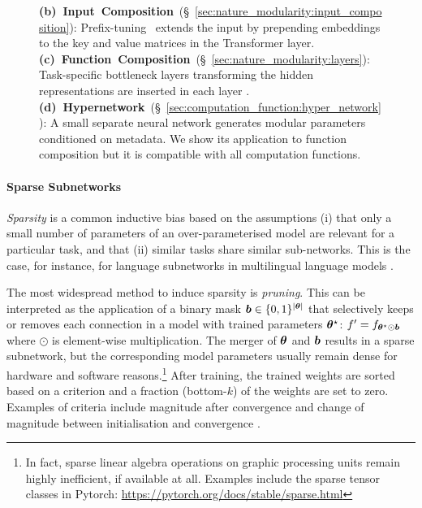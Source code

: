 \documentclass[10pt]{article} %
\begin{document}
\begin{figure}[t]
{     \textbf{(b)~Input~Composition}~(\S~\ref{sec:nature_modularity:input_composition}): Prefix-tuning~\citep{Li2020PrefixTuning} extends the input by prepending embeddings to the key and value matrices in the Transformer layer.  
     \textbf{(c)~Function~Composition}~(\S~\ref{sec:nature_modularity:layers}): Task-specific bottleneck layers transforming the hidden representations are inserted in each layer  \citep{houlsby2019parameter}.  
     \textbf{(d)~Hypernetwork}~(\S~\ref{sec:computation_function:hyper_network}): A small separate neural network generates modular parameters conditioned on metadata. We show its application to function composition but it is compatible with all computation functions.
    }
\label{fig:nature_modularity}
\end{figure}

\paragraph*{Sparse Subnetworks} \label{sec:routing:sparsemasks} 

\textit{Sparsity} is a common inductive bias based on the assumptions (i) that only a small number of parameters of an over-parameterised model are relevant for a particular task, and that (ii) similar tasks share similar sub-networks. This is the case, for instance, for language subnetworks in multilingual language models \citep{stanczak-etal-2022-neurons,Foroutan2022Discovering}.

The most widespread method to induce sparsity is \textit{pruning}.
This can be interpreted as the application of a binary mask ${\bm{b}} \in \{0, 1\}^{|{\bm{\theta}}|}$ that selectively keeps or removes each connection in a model with trained parameters ${\bm{\theta}}^\star$: $f^\prime = f_{{\bm{\theta}}^\star\odot{\bm{b}}}$ where $\odot$ is element-wise multiplication. The merger of ${\bm{\theta}}$ and ${\bm{b}}$ results in a sparse subnetwork, but the corresponding model parameters usually remain dense for hardware and software reasons.\footnote{In fact, sparse linear algebra operations on graphic processing units remain highly inefficient, if available at all. Examples include the sparse tensor classes in Pytorch: \url{https://pytorch.org/docs/stable/sparse.html}}  After training, the trained weights are sorted based on a criterion and a fraction (bottom-$k$) of the weights are set to zero. Examples of criteria include magnitude after convergence \citep{han2016dsd} and change of magnitude between initialisation and convergence \citep{Frankle2019}.
\end{document}
